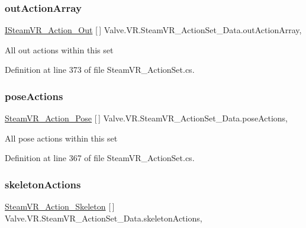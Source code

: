 \subsubsection{\texorpdfstring{outActionArray}{outActionArray}}
{\footnotesize\ttfamily \mbox{\hyperlink{interface_valve_1_1_v_r_1_1_i_steam_v_r___action___out}{I\+Steam\+V\+R\+\_\+\+Action\+\_\+\+Out}} \mbox{[}$\,$\mbox{]} Valve.\+V\+R.\+Steam\+V\+R\+\_\+\+Action\+Set\+\_\+\+Data.\+out\+Action\+Array\hspace{0.3cm}{\ttfamily [get]}, {\ttfamily [set]}}



All out actions within this set 



Definition at line 373 of file Steam\+V\+R\+\_\+\+Action\+Set.\+cs.

\mbox{\label{class_valve_1_1_v_r_1_1_steam_v_r___action_set___data_a8a160d48ee6e95f8d4208dc269731cb2}} 
\subsubsection{\texorpdfstring{poseActions}{poseActions}}
{\footnotesize\ttfamily \mbox{\hyperlink{class_valve_1_1_v_r_1_1_steam_v_r___action___pose}{Steam\+V\+R\+\_\+\+Action\+\_\+\+Pose}} \mbox{[}$\,$\mbox{]} Valve.\+V\+R.\+Steam\+V\+R\+\_\+\+Action\+Set\+\_\+\+Data.\+pose\+Actions\hspace{0.3cm}{\ttfamily [get]}, {\ttfamily [set]}}



All pose actions within this set 



Definition at line 367 of file Steam\+V\+R\+\_\+\+Action\+Set.\+cs.

\mbox{\label{class_valve_1_1_v_r_1_1_steam_v_r___action_set___data_a5adc54b82c2104cfd5ff0795c3b068d9}} 
\subsubsection{\texorpdfstring{skeletonActions}{skeletonActions}}
{\footnotesize\ttfamily \mbox{\hyperlink{class_valve_1_1_v_r_1_1_steam_v_r___action___skeleton}{Steam\+V\+R\+\_\+\+Action\+\_\+\+Skeleton}} \mbox{[}$\,$\mbox{]} Valve.\+V\+R.\+Steam\+V\+R\+\_\+\+Action\+Set\+\_\+\+Data.\+skeleton\+Actions\hspace{0.3cm}{\ttfamily [get]}, {\ttfamily [set]}}



